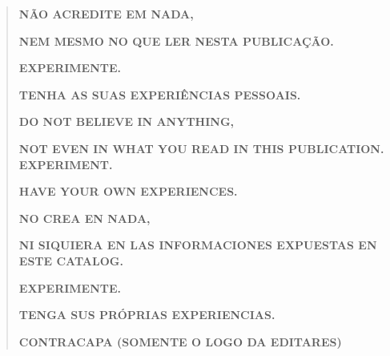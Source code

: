 \documentclass[
]{article}
\begin{document}
\begin{quote}
\textbf{NÃO ACREDITE EM NADA,}

\textbf{NEM MESMO NO QUE LER NESTA PUBLICAÇÃO.}

\textbf{EXPERIMENTE.}

\textbf{TENHA AS SUAS EXPERIÊNCIAS PESSOAIS.}

\textbf{DO NOT BELIEVE IN ANYTHING,}

\textbf{NOT EVEN IN WHAT YOU READ IN THIS PUBLICATION. EXPERIMENT.}

\textbf{HAVE YOUR OWN EXPERIENCES.}

\textbf{NO CREA EN NADA,}

\textbf{NI SIQUIERA EN LAS INFORMACIONES EXPUESTAS EN ESTE CATALOG.}

\textbf{EXPERIMENTE.}

\textbf{TENGA SUS PRÓPRIAS EXPERIENCIAS.}

\textbf{CONTRACAPA (SOMENTE O LOGO DA EDITARES)}
\end{quote}
\end{document}
